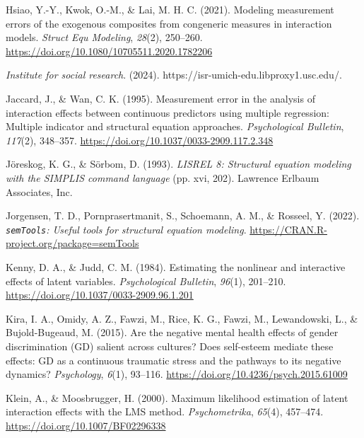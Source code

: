 \documentclass[
  man]{apa7}
\newlength{\cslhangindent}
\newlength{\cslentryspacingunit} %
\newenvironment{CSLReferences}[2] %
 {%
  \setlength{\parindent}{0pt}
  \ifodd #1
  \let\oldpar\par
  \def\par{\hangindent=\cslhangindent\oldpar}
  \fi
  \setlength{\parskip}{#2\cslentryspacingunit}
 }%
 {}
\begin{document}
\begin{CSLReferences}{1}{0}
\leavevmode{}%
Hsiao, Y.-Y., Kwok, O.-M., \& Lai, M. H. C. (2021). Modeling measurement errors of the exogenous composites from congeneric measures in interaction models. \emph{Struct Equ Modeling}, \emph{28}(2), 250--260. \url{https://doi.org/10.1080/10705511.2020.1782206}

\leavevmode{}%
\emph{Institute for social research}. (2024). https://isr-umich-edu.libproxy1.usc.edu/.

\leavevmode{}%
Jaccard, J., \& Wan, C. K. (1995). Measurement error in the analysis of interaction effects between continuous predictors using multiple regression: {Multiple} indicator and structural equation approaches. \emph{Psychological Bulletin}, \emph{117}(2), 348--357. \url{https://doi.org/10.1037/0033-2909.117.2.348}

\leavevmode{}%
Jöreskog, K. G., \& Sörbom, D. (1993). \emph{{LISREL} 8: {Structural} equation modeling with the {SIMPLIS} command language} (pp. xvi, 202). Lawrence Erlbaum Associates, Inc.

\leavevmode{}%
Jorgensen, T. D., Pornprasertmanit, S., Schoemann, A. M., \& Rosseel, Y. (2022). \emph{\texttt{semTools}: {U}seful tools for structural equation modeling}. \url{https://CRAN.R-project.org/package=semTools}

\leavevmode{}%
Kenny, D. A., \& Judd, C. M. (1984). Estimating the nonlinear and interactive effects of latent variables. \emph{Psychological Bulletin}, \emph{96}(1), 201--210. \url{https://doi.org/10.1037/0033-2909.96.1.201}

\leavevmode{}%
Kira, I. A., Omidy, A. Z., Fawzi, M., Rice, K. G., Fawzi, M., Lewandowski, L., \& Bujold-Bugeaud, M. (2015). Are the negative mental health effects of gender discrimination ({GD}) salient across cultures? {Does} self-esteem mediate these effects: {GD} as a continuous traumatic stress and the pathways to its negative dynamics? \emph{Psychology}, \emph{6}(1), 93--116. \url{https://doi.org/10.4236/psych.2015.61009}

\leavevmode{}%
Klein, A., \& Moosbrugger, H. (2000). Maximum likelihood estimation of latent interaction effects with the {LMS} method. \emph{Psychometrika}, \emph{65}(4), 457--474. \url{https://doi.org/10.1007/BF02296338}


\end{CSLReferences}
\end{document}
